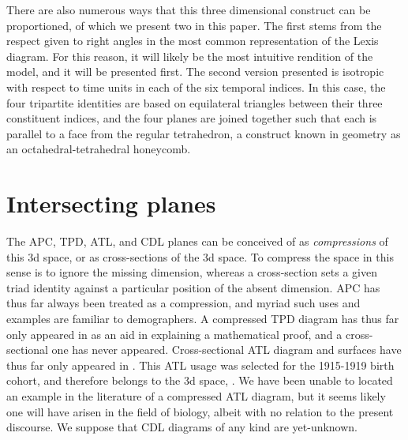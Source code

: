 \documentclass[11pt,oneside,a4paper]{article} %
\begin{document}
There are also
numerous ways that this three dimensional construct can be proportioned, of
which we present two in this paper. The first stems from the respect given to
right angles in the most common representation of the Lexis diagram. For this reason, it will likely be
the most intuitive rendition of the model, and it will be presented first. The
second version presented is isotropic with respect to time units in each of the
six temporal indices. In this case, the four tripartite identities are based on
equilateral triangles between their three constituent indices, and the four
planes are joined together such that each is parallel to a face from the regular
tetrahedron, a construct known in geometry as an octahedral-tetrahedral
honeycomb.

\section*{Intersecting planes}

The APC, TPD, ATL, and CDL planes can be conceived of as
\textit{compressions} of this 3d space, or as cross-sections of the 3d space. To
compress the space in this sense is to ignore the missing dimension,
whereas a cross-section sets a given triad identity against a particular
position of the absent dimension. APC has thus far always been treated as a
compression, and myriad such uses and examples are familiar to demographers.
A compressed TPD diagram has thus far only appeared in \citet{pancho2015}
as an aid in explaining a mathematical proof, and a cross-sectional one has
never appeared.
Cross-sectional ATL diagram and surfaces have thus far only appeared in
\citet{riffe2015ttd}. This ATL usage was selected for the 1915-1919 birth
cohort, and therefore belongs to the 3d
space,
.
We have been unable to located an example in the literature of a compressed
ATL diagram, but it seems likely one will have arisen in the field of
biology, albeit with no relation to the present discourse. We suppose
that CDL diagrams of any kind are yet-unknown.
\end{document}
